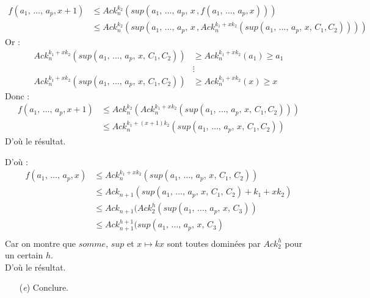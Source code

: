 \documentclass[12pt,letterpaper,boxed]{hmcpset}
\begin{document}
\begin{solution}
\begin{solution}[(d)]
\begin{itemize}
\begin{itemize}[leftmargin=*]
		\begin{align*}
			f(a_{1}, \, \dots , \, a_{p}, x+1) & \leq Ack^{k_{2}}_{n}(sup(a_{1}, \, \dots , \, a_{p}, \, x \, , f(a_{1}, \, \dots , \, a_{p}, x) )) \\
			& \leq Ack^{k_{2}}_{n}(sup(a_{1}, \, \dots , \, a_{p}, \, x \, , Ack^{k_{1} + xk_{2}}_{n}(sup(a_{1}, \, \dots , \, a_{p},  \, x, \, C_{1}, C_{2})) ))
		\end{align*}
		\noindent Or : 
		\begin{align*}
		Ack^{k_{1} + xk_{2}}_{n}(sup(a_{1}, \, \dots , \, a_{p},  \, x, \, C_{1}, C_{2})) & \geq  Ack^{k_{1} + xk_{2}}_{n}(a_{1}) \geq a_{1} \\
		& \vdots  \\
		Ack^{k_{1} + xk_{2}}_{n}(sup(a_{1}, \, \dots , \, a_{p},  \, x, \, C_{1}, C_{2})) & \geq  Ack^{k_{1} + xk_{2}}_{n}(x) \geq x
		\end{align*}
		Donc :
		\begin{align*}
			f(a_{1}, \, \dots , \, a_{p}, x+1) 
& \leq Ack^{k_{2}}_{n}(Ack^{k_{1} + xk_{2}}_{n}(sup(a_{1}, \, \dots , \, a_{p},  \, x, \, C_{1}, C_{2})) ) \\
		& \leq Ack^{k_{1} + (x+1)k_{2}}_{n}(sup(a_{1}, \, \dots , \, a_{p},  \, x, \, C_{1}, C_{2})) 
		\end{align*}
		D'où le résultat.
	\end{itemize}

\newpage 

\noindent D'où : 
\begin{align*}
f(a_{1}, \, \dots , \, a_{p}, x) & \leq  Ack^{k_{1} + xk_{2}}_{n}(sup(a_{1}, \, \dots , \, a_{p}, \, x, \,  C_{1}, \, C_{2})) \\
& \leq  Ack_{n+1}(sup(a_{1}, \, \dots , \, a_{p}, \, x, \,  C_{1}, \, C_{2})+k_{1} + xk_{2}) \\
& \leq  Ack_{n+1}(Ack^{h}_{2}(sup(a_{1}, \, \dots , \, a_{p}, \, x, \,  C_{3})) \\
& \leq  Ack^{h+1}_{n+1}(sup(a_{1}, \, \dots , \, a_{p}, \, x, \,  C_{3}) \\
\end{align*}
Car on montre que $somme$, $sup$ et $x \mapsto kx$ sont toutes dominées par $Ack^{h}_{2}$ pour un certain $h$. \\
D'où le résultat.


\end{itemize}

\end{solution}

\begin{problem}
\begin{itemize}  
  \item[(\textit{e})]  Conclure. \end{itemize}
 \end{problem}
 

\end{solution}
\end{document}
